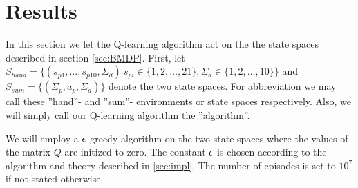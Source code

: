 \section{Results}
In this section we let the Q-learning algorithm act on the the state spaces described in section \ref{sec:BMDP}. First, let $S_{hand}=\{  (s_{p1},\ldots,s_{p10},\Sigma_{d})\ s_{pi} \in \{1,2,\ldots, 21 \}, \Sigma_{d}\in \{1,2,\ldots, 10 \} \}$ and $S_{sum}=\{  (\Sigma_p, a_p, \Sigma_d )  \}$ denote the two state spaces. For abbreviation we may call these ''hand''- and ''sum''- environments or state spaces respectively. Also, we will simply call our Q-learning algorithm the ''algorithm''.

We will employ a $\epsilon$ greedy algorithm on the two state spaces where the values of the matrix $Q$ are initized to zero. The constant $\epsilon$ is chosen according to the algorithm and theory described in \ref{sec:impl}. The number of episodes is set to $10^7$ if not stated otherwise. 


